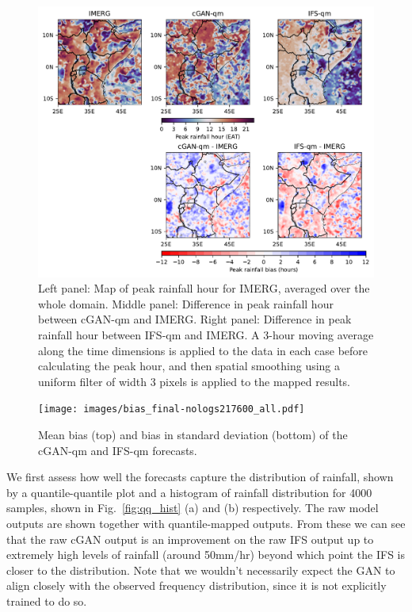 \documentclass{article}
\begin{document}
\begin{figure}
\centering
        \includegraphics[width=\textwidth]{images/diurnal_cycle_map_All_final-nologs_217600.pdf}

     \caption{Left panel: Map of peak rainfall hour for IMERG, averaged over the whole domain. Middle panel: Difference in peak rainfall hour between cGAN-qm and IMERG. Right panel: Difference in peak rainfall hour between IFS-qm and IMERG. A 3-hour moving average along the time dimensions is applied to the data in each case before calculating the peak hour, and then spatial smoothing using a uniform filter of width 3 pixels is applied to the mapped results.}
     \label{fig:peak_hour}
\end{figure}


\begin{figure}
    \centering
     \texttt{[image: images/bias\_final-nologs217600\_all.pdf]}
    
     \caption{Mean bias (top) and bias in standard deviation (bottom) of the cGAN-qm and IFS-qm forecasts.}
     \label{fig:bias}
\end{figure}



 We first assess how well the forecasts capture the distribution of rainfall, shown by a quantile-quantile plot and a histogram of rainfall distribution for 4000 samples, shown in Fig.~\ref{fig:qq_hist} (a) and (b) respectively. The raw model outputs are shown together with quantile-mapped outputs. From these we can see that the raw cGAN output is an improvement on the raw IFS output up to extremely high levels of rainfall (around 50mm/hr) beyond which point the IFS is closer to the distribution. Note that we wouldn't necessarily expect the GAN to align closely with the observed frequency distribution, since it is not explicitly trained to do so.
\end{document}
